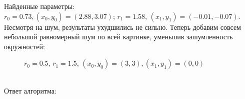 \documentclass[12pt,twoside]{article}
\begin{document}
Найденные параметры: $r_0 = 0.73, (x_0, y_0) = (2.88, 3.07); \, r_1 = 1.58, \, (x_1, y_1) = (-0.01, -0.07)$. Несмотря на шум, результаты ухудшились не сильно. \newpage
Теперь добавим совсем небольшой равномерный шум по всей картинке, уменьшив зашумленность окружностей:
\begin{figure}[h]
\caption{$r_0 = 0.5, \, r_1 = 1.5, \, (x_0, y_0) = (3, 3), (x_1, y_1) = (0, 0)$}
\end{figure} \\
Ответ алгоритма: \\
\begin{figure}[h]
\end{figure}\\
\end{document}
